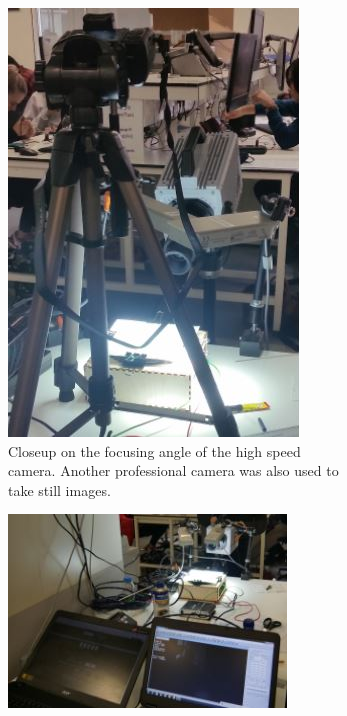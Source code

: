 \begin{figure}[ht]
    \begin{subfigure}[t]{0.5\textwidth}
        \centering
        \includegraphics[width=\textwidth]{prototype/exp_rep_imgs/closeup_highspeedcamera.jpg}
        \caption{Closeup on the focusing angle of the high speed camera. Another professional camera was also used to take still images.}
        \label{fig:closeup_highspeedcamera}
    \end{subfigure}
    \begin{subfigure}[t]{0.5\textwidth}
        \centering
        \includegraphics[width=\textwidth]{prototype/exp_rep_imgs/software_highspeedcamera.jpg}

\end{subfigure}
\end{figure}
